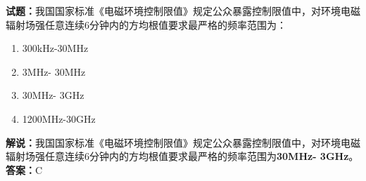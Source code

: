 \documentclass{ctexbook}
\begin{document}
%
%


%
%
%


%


\noindent\textbf{试题：}我国国家标准《电磁环境控制限值》规定公众暴露控制限值中，对环境电磁辐射场强任意连续6分钟内的方均根值要求最严格的频率范围为：
\begin{enumerate}[leftmargin=3em]
\item 300\unit{\kHz}-30\unit{\MHz}
\item 3\unit{\MHz}- 30\unit{\MHz}
\item 30\unit{\MHz}- 3\unit{\GHz}
\item 1200\unit{\MHz}-30\unit{\GHz}
\end{enumerate}
\noindent\textbf{解说：}我国国家标准《电磁环境控制限值》规定公众暴露控制限值中，对环境电磁辐射场强任意连续6分钟内的方均根值要求最严格的频率范围为\textbf{30\unit{\MHz}- 3\unit{\GHz}}。\\\textbf{答案：}C
\end{document}
